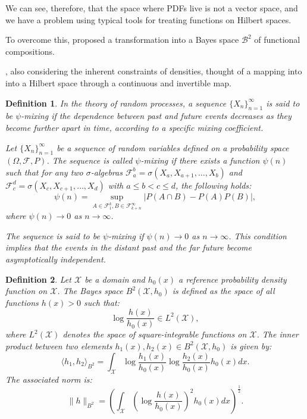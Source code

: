 \documentclass[
	12pt,				%
	oneside,			%
	a4paper,			%
	english,			%
	brazil				%
	]{abntex2ppgsi}
\newtheorem{theorem}{Theorem} %
\newtheorem{lemma}{Lemma}     %
\newtheorem{definition}{Definition}
\begin{document}
We can see, therefore, that the space where PDFs live is not a vector space, and we have a problem using typical tools for treating functions on Hilbert spaces.

To overcome this,  proposed a transformation into a Bayes space $\mathcal{B}^2$ of functional compositions.

, also considering the inherent constraints of densities, thought of a mapping into into a Hilbert space through a continuous and invertible map.




\begin{definition}
In the theory of random processes, a sequence $\{ X_n \}_{n=1}^{\infty}$ is said to be $\psi$-mixing if the dependence between past and future events decreases as they become further apart in time, according to a specific mixing coefficient.

Let $\{ X_n \}_{n=1}^{\infty}$ be a sequence of random variables defined on a probability space $(\Omega, \mathcal{F}, P)$. The sequence is called \emph{$\psi$-mixing} if there exists a function $\psi(n)$ such that for any two $\sigma$-algebras $\mathcal{F}_a^b = \sigma(X_a, X_{a+1}, \ldots, X_b)$ and $\mathcal{F}_c^d = \sigma(X_c, X_{c+1}, \ldots, X_d)$ with $a \leq b < c \leq d$, the following holds:
\[
\psi(n) = \sup_{A \in \mathcal{F}_1^k, B \in \mathcal{F}_{k+n}^\infty} |P(A \cap B) - P(A)P(B)|,
\]
where $\psi(n) \to 0$ as $n \to \infty$.

The sequence is said to be $\psi$-mixing if $\psi(n) \to 0$ as $n \to \infty$. This condition implies that the events in the distant past and the far future become asymptotically independent.
\end{definition}

\begin{definition}

Let $\mathcal{X}$ be a domain and $h_0(x)$ a reference probability density function on $\mathcal{X}$. The \emph{Bayes space} $B^2(\mathcal{X}, h_0)$ is defined as the space of all functions $h(x) > 0$ such that:
\[
\log \frac{h(x)}{h_0(x)} \in L^2(\mathcal{X}),
\]
where $L^2(\mathcal{X})$ denotes the space of square-integrable functions on $\mathcal{X}$. The inner product between two elements $h_1(x), h_2(x) \in B^2(\mathcal{X}, h_0)$ is given by:
\[
\langle h_1, h_2 \rangle_{B^2} = \int_{\mathcal{X}} \log \frac{h_1(x)}{h_0(x)} \log \frac{h_2(x)}{h_0(x)} h_0(x) dx.
\]
The associated norm is:
\[
\| h \|_{B^2} = \left( \int_{\mathcal{X}} \left( \log \frac{h(x)}{h_0(x)} \right)^2 h_0(x) dx \right)^{\frac{1}{2}}.
\]
\end{definition}
\end{document}
